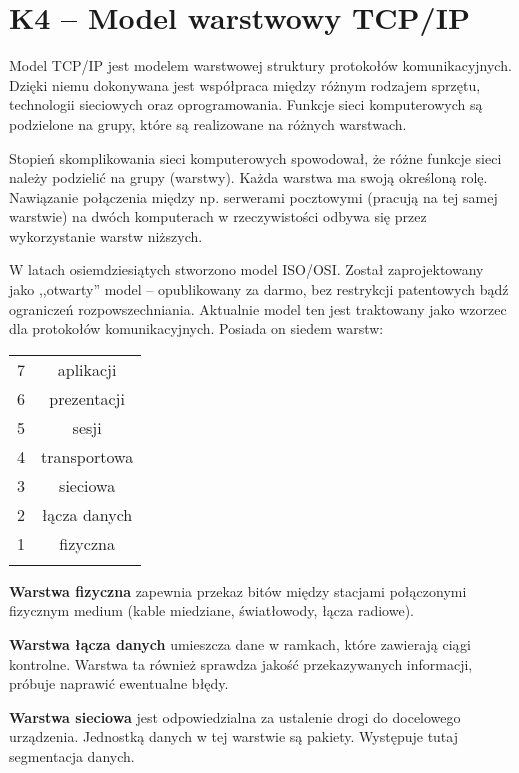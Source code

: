 \sloppy\section{K4 -- Model warstwowy TCP/IP}
Model TCP/IP jest modelem warstwowej struktury protokołów komunikacyjnych. Dzięki niemu dokonywana jest współpraca między różnym rodzajem sprzętu, technologii sieciowych oraz oprogramowania. Funkcje sieci komputerowych są podzielone na grupy, które są realizowane na różnych warstwach.

Stopień skomplikowania sieci komputerowych spowodował, że różne funkcje sieci należy podzielić na grupy (warstwy). Każda warstwa ma swoją określoną rolę. Nawiązanie połączenia między np. serwerami pocztowymi (pracują na tej samej warstwie) na dwóch komputerach w rzeczywistości odbywa się przez wykorzystanie warstw niższych.

W latach osiemdziesiątych stworzono model ISO/OSI. Został zaprojektowany jako ,,otwarty'' model -- opublikowany za darmo, bez restrykcji patentowych bądź ograniczeń rozpowszechniania. Aktualnie model ten jest traktowany jako wzorzec dla protokołów komunikacyjnych. Posiada on siedem warstw:
\begin{table}[H]
\centering
\begin{tabular}{c|c|} \hhline{~-}
7 & \cellcolor{blue!20}aplikacji    \\ \hhline{~-}
6 & \cellcolor{blue!20}prezentacji  \\ \hhline{~-}
5 & \cellcolor{blue!20}sesji        \\ \hhline{~-}
4 & \cellcolor{red!20}transportowa \\ \hhline{~-}
3 & \cellcolor{green!20}sieciowa     \\ \hhline{~-}
2 & \cellcolor{yellow!20}łącza danych \\ \hhline{~-}
1 & \cellcolor{yellow!20}fizyczna     \\ \hhline{~-}
\end{tabular}
\end{table}

\textbf{Warstwa fizyczna} zapewnia przekaz bitów między stacjami połączonymi fizycznym medium (kable miedziane, światłowody, łącza radiowe).

\textbf{Warstwa łącza danych} umieszcza dane w ramkach, które zawierają ciągi kontrolne. Warstwa ta również sprawdza jakość przekazywanych informacji, próbuje naprawić ewentualne błędy.

\textbf{Warstwa sieciowa} jest odpowiedzialna za ustalenie drogi do docelowego urządzenia. Jednostką danych w tej warstwie są pakiety. Występuje tutaj segmentacja danych.

